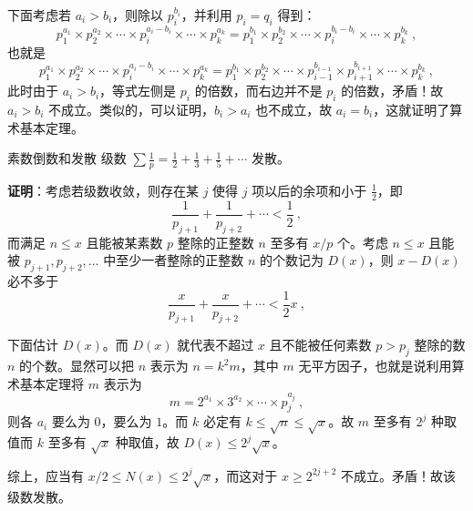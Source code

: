 下面考虑若 $a_i > b_i$，则除以 $p_i^{b_i}$，并利用 $p_i = q_i$ 得到：
\begin{equation}
p_1^{a_1} \times p_2^{a_2} \times \cdots \times p_i^{a_i - b_i} \times \cdots \times p_k^{a_k} = p_1^{b_1} \times p_2^{b_2} \times \cdots \times p_i^{b_i - b_i} \times \cdots \times p_k^{b_k} ~,
\end{equation}
也就是
\begin{equation}
p_1^{a_1} \times p_2^{a_2} \times \cdots \times p_i^{a_i - b_i} \times \cdots \times p_k^{a_k} = p_1^{b_1} \times p_2^{b_2} \times \cdots \times p_{i-1}^{b_{i-1}} \times p_{i+1}^{b_{i+1}} \times \cdots \times p_k^{b_k} ~,
\end{equation}
此时由于 $a_i > b_i$，等式左侧是 $p_i$ 的倍数，而右边并不是 $p_i$ 的倍数，矛盾！故 $a_i > b_i$ 不成立。类似的，可以证明，$b_i > a_i$ 也不成立，故 $a_i = b_i$，这就证明了算术基本定理。

\begin{theorem}{素数倒数和发散}
级数 $\sum \frac1p = \frac 12 + \frac 13 + \frac 15 + \cdots$ 发散。
\end{theorem}
\textbf{证明}：考虑若级数收敛，则存在某 $j$ 使得 $j$ 项以后的余项和小于 $\frac 12$，即
\begin{equation}
\frac{1}{p_{j+1}} + \frac{1}{p_{j+2}} + \cdots < \frac 12 ~,
\end{equation}
而满足 $n \le x$ 且能被某素数 $p$ 整除的正整数 $n$ 至多有 $x/p$ 个。考虑 $n \le x$ 且能被 $p_{j+1}, p_{j+2}, \dots$ 中至少一者整除的正整数 $n$ 的个数记为 $D(x)$，则 $x-D(x)$ 必不多于
\begin{equation}
\frac{x}{p_{j+1}} + \frac{x}{p_{j+2}} + \cdots < \frac{1}{2} x ~,
\end{equation}

下面估计 $D(x)$。而 $D(x)$ 就代表不超过 $x$ 且不能被任何素数 $p > p_j$ 整除的数 $n$ 的个数。显然可以把 $n$ 表示为 $n = k^2 m$，其中 $m$ 无平方因子，也就是说利用算术基本定理将 $m$ 表示为
\begin{equation}
m = 2^{a_1} \times 3^{a_2} \times \cdots \times p_{j}^{a_j } ~,
\end{equation}
则各 $a_i$ 要么为 $0$，要么为 $1$。而 $k$ 必定有 $k \le \sqrt n \le \sqrt x$。故 $m$ 至多有 $2^j$ 种取值而 $k$ 至多有 $\sqrt x$ 种取值，故 $D(x) \le 2^j \sqrt x$。

综上，应当有 $x/2 \le N(x) \le 2^j \sqrt x$，而这对于 $x \ge 2^{2j+2}$ 不成立。矛盾！故该级数发散。
